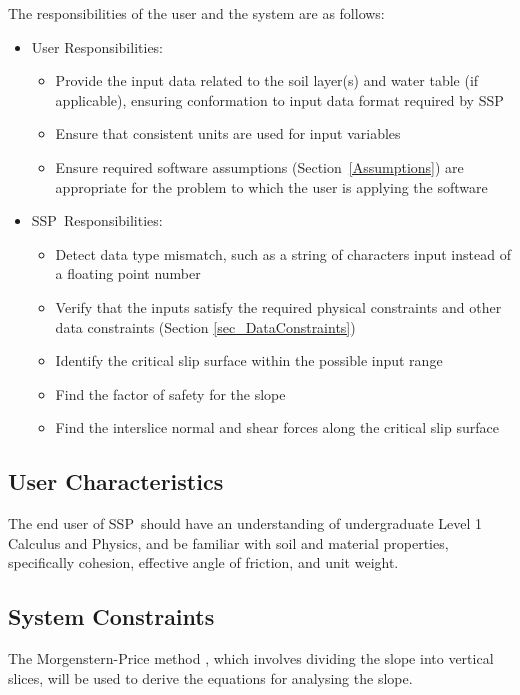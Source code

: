 \documentclass[12pt]{article}
\newcommand{\progname}{SSP}
\begin{document}
\noindent The responsibilities of the user and the system are as follows:

\begin{itemize}
\item User Responsibilities:
  \begin{itemize}
  \item Provide the input data related to the soil layer(s) and water table (if 
  applicable), ensuring conformation to input data format required by \progname
  \item Ensure that consistent units are used for input variables
  \item Ensure required software assumptions (Section~\ref{Assumptions}) are
    appropriate for the problem to which the user is applying the software
  \end{itemize}
\item \progname\ Responsibilities:
  \begin{itemize}
  \item Detect data type mismatch, such as a string of characters input instead
    of a floating point number
  \item Verify that the inputs satisfy the required physical constraints and 
  other data constraints (Section \ref{sec_DataConstraints})
  \item Identify the critical slip surface within the possible input range
  \item Find the factor of safety for the slope
  \item Find the interslice normal and shear forces along the critical slip 
  surface
  \end{itemize}
\end{itemize}

\subsection{User Characteristics}
\label{Sec:UserChar}
The end user of \progname\ should have an understanding of undergraduate
Level 1 Calculus and Physics, and be familiar with soil and material
properties, specifically cohesion, effective angle of friction, and unit weight.

\subsection{System Constraints} \label{sec_SystConstraints}

The Morgenstern-Price method \citep{MorgPrice}, which involves dividing the 
slope into vertical 
slices, will be used to derive the equations for analysing the slope. 
\end{document}

